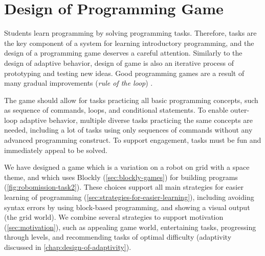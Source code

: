 \chapter{Design of Programming Game}
\label{chap:design-of-game}


Students learn programming by solving programming tasks.
Therefore, tasks are the key component of a system for learning introductory
programming, and the design of a programming game deserves a careful attention.
Similarly to the design of adaptive behavior, design of game is also an iterative
process of prototyping and testing new ideas.
Good programming games are a result of many gradual improvements
(\emph{rule of the loop}) \cite{book-of-lenses}.


The game should allow for tasks practicing all basic
programming concepts, such as sequence of commands, loops, and conditional
statements. %
To enable outer-loop adaptive behavior, multiple diverse tasks practicing the same
concepts are needed, including a lot of tasks using only sequences of commands
without any advanced programming construct.
To support engagement, tasks must be fun and immediately appeal to be
solved.  %


We have designed a game which is a variation on a robot
on grid with a space theme, and which uses Blockly (\cref{sec:blockly-games})
for building programs
(\cref{fig:robomission-task2}).
These choices support all main strategies for easier learning of programming
(\cref{sec:strategies-for-easier-learning}),
including
avoiding syntax errors by using block-based programming, and
showing a visual output (the grid world).
We combine several strategies to support motivation (\cref{sec:motivation}),
such as appealing game world, entertaining tasks, progressing through levels,
and recommending tasks of optimal difficulty
(adaptivity discussed in \cref{chap:design-of-adaptivity}).

